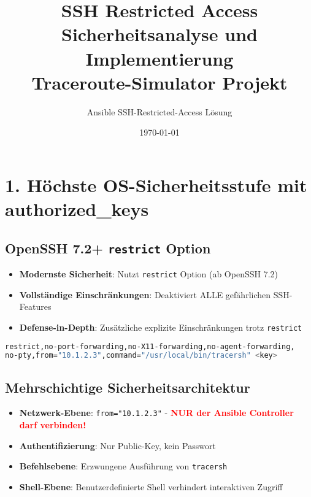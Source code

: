 \documentclass[10pt,a4paper]{article}
\title{\textbf{SSH Restricted Access}\\
\large Sicherheitsanalyse und Implementierung\\
\normalsize Traceroute-Simulator Projekt}
\author{Ansible SSH-Restricted-Access Lösung}
\date{\today}
\begin{document}
\maketitle

\section*{1. Höchste OS-Sicherheitsstufe mit authorized\_keys}

\subsection*{OpenSSH 7.2+ \texttt{restrict} Option}
\begin{itemize}
    \item \textbf{Modernste Sicherheit}: Nutzt \texttt{restrict} Option (ab OpenSSH 7.2)
    \item \textbf{Vollständige Einschränkungen}: Deaktiviert ALLE gefährlichen SSH-Features
    \item \textbf{Defense-in-Depth}: Zusätzliche explizite Einschränkungen trotz \texttt{restrict}
\end{itemize}

\begin{lstlisting}[language=bash,title=authorized\_keys Konfiguration (NUR Ansible Controller erlaubt!)]
restrict,no-port-forwarding,no-X11-forwarding,no-agent-forwarding,
no-pty,from="10.1.2.3",command="/usr/local/bin/tracersh" <key>
\end{lstlisting}

\subsection*{Mehrschichtige Sicherheitsarchitektur}
\begin{itemize}    \item \textbf{Netzwerk-Ebene}: \texttt{from="10.1.2.3"} - \textcolor{red}{\textbf{NUR der Ansible Controller darf verbinden!}}
    \item \textbf{Authentifizierung}: Nur Public-Key, kein Passwort
    \item \textbf{Befehlsebene}: Erzwungene Ausführung von \texttt{tracersh}
    \item \textbf{Shell-Ebene}: Benutzerdefinierte Shell verhindert interaktiven Zugriff
\end{itemize}
\end{document}
